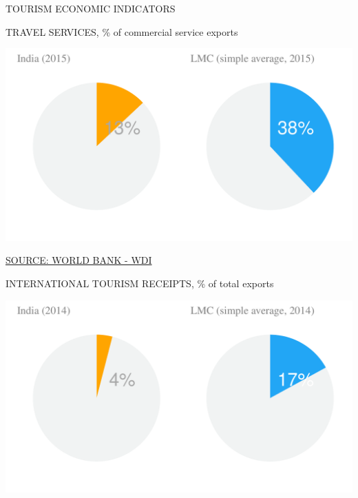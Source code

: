 \documentclass{article}\usepackage[]{graphicx}\usepackage[]{color}
\makeatletter
\def\maxwidth{ %
  \ifdim\Gin@nat@width>\linewidth
    \linewidth
  \else
    \Gin@nat@width
  \fi
}
\makeatother
\begin{document}
\begin{minipage}[c]{0.95\textwidth}
  \vspace{5ex}
  \begin{flushleft}  
    \hspace{4ex}\Large{\textcolor[HTML]{FF4023}{TOURISM ECONOMIC INDICATORS}}\hspace{2ex}\small{\textcolor[HTML]{818181} {}}
  \end{flushleft} 
  \begin{minipage}[c]{0.5\textwidth}
  \hspace{4ex}\small{\textcolor[HTML]{818181}{TRAVEL SERVICES, \% of commercial service exports}}
    \vspace{1ex}


{\centering \includegraphics[width=\maxwidth]{figure/pie2_1-1} 

}



  \hspace{4ex}\scriptsize{\href{NA}{\textcolor[HTML]{FF4023}{SOURCE: WORLD BANK - WDI}}}
  \end{minipage}
  \begin{minipage}[c]{0.5\textwidth}
  \hspace{4ex}\small{\textcolor[HTML]{818181}{INTERNATIONAL TOURISM RECEIPTS, \% of total exports}}
    \vspace{1ex}


{\centering \includegraphics[width=\maxwidth]{figure/pie2_2-1} 

}
\end{minipage}
\end{minipage}
\end{document}
